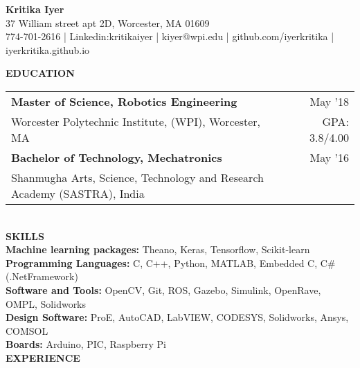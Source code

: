 \documentclass[10pt,a4paper]{article}
\begin{document}
\begin{center}

\textbf{\Large{Kritika Iyer}}\\
37 William street apt 2D, Worcester, MA 01609\\
774-701-2616 | Linkedin:kritikaiyer | kiyer@wpi.edu | github.com/iyerkritika | iyerkritika.github.io\\
\end{center}
\textbf{EDUCATION}\\
\begin{tabular}{p{} r}
\textbf{Master of Science, Robotics Engineering} & May '18 \\
Worcester Polytechnic Institute, (WPI), Worcester, MA & GPA: 3.8/4.00 \\[1ex]
\textbf{Bachelor of Technology, Mechatronics} & May '16 \\
Shanmugha Arts, Science, Technology  and Research Academy (SASTRA), India
\end{tabular}
\\[1\baselineskip]
\textbf{SKILLS}\\
\textbf{Machine learning packages:} Theano, Keras, Tensorflow, Scikit-learn\\
\textbf{Programming Languages:} C, C++, Python, MATLAB, Embedded C, C\#(.NetFramework)\\
\textbf{Software and Tools:} OpenCV, Git, ROS, Gazebo, Simulink, OpenRave, OMPL, Solidworks \\
\textbf{Design Software:} ProE, AutoCAD, LabVIEW, CODESYS, Solidworks, Ansys, COMSOL\\
\textbf{Boards:} Arduino, PIC, Raspberry Pi\\[1\baselineskip]
\textbf{EXPERIENCE}\\
\end{document}
